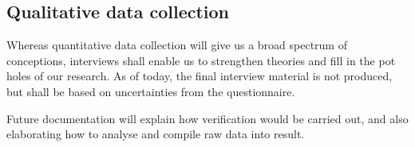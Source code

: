 \documentclass[ProjectPlan_innit.tex]{subfiles}
\begin{document}
\subsection{Qualitative data collection}
Whereas quantitative data collection will give us a broad spectrum of conceptions, interviews shall enable us to strengthen theories and fill in the pot holes of our research. As of today, the final interview material is not produced, but shall be based on uncertainties from the questionnaire.

\smallskip
Future documentation will explain how verification would be carried out, and also elaborating how to analyse and compile raw data into result.

\end{document}
